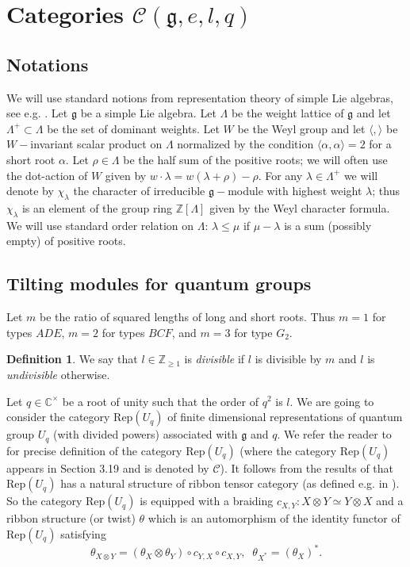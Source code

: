 \documentclass{amsart}
\theoremstyle{definition}
\newtheorem{definition}[theorem]{Definition}
\newcommand{\C}{\mathcal{C}}
\newcommand{\BC}{\mathbb{C}}
\newcommand{\Z}{\mathbb{Z}}
\newcommand{\g}{\mathfrak{g}}
\newcommand{\Rep}{\text{Rep}}
\numberwithin{equation}{section}
\begin{document}
\section{Categories $\C(\g,e,l,q)$}
\subsection{Notations} We will use standard notions from representation theory of simple Lie algebras,
see e.g. \cite{Scho}.
Let $\g$ be a simple Lie algebra. Let $\Lambda$ be the weight lattice of $\g$ and
let $\Lambda^+\subset \Lambda$ be the set of  dominant weights. Let $W$ be the Weyl group
and let $\langle , \rangle$ be $W-$invariant scalar product on $\Lambda$ normalized 
by the condition $\langle \alpha, \alpha \rangle =2$ for a short root $\alpha$. Let $\rho \in \Lambda$ be
the half sum of the positive roots; we will often use the dot-action of $W$ given by 
$w\cdot \lambda =w(\lambda +\rho)-\rho$. For any $\lambda \in \Lambda^+$ we will denote
by $\chi_\lambda$ the character of irreducible $\g-$module with highest weight $\lambda$; thus 
$\chi_\lambda$ is an element of the group ring $\Z[\Lambda]$ given by the Weyl character formula.
We will use standard order relation on $\Lambda$: $\lambda \le \mu$ if $\mu -\lambda$ is a sum 
(possibly empty) of positive roots.

\subsection{Tilting modules for quantum groups}\label{qgtitling}
Let $m$ be the ratio of squared lengths of long and short roots. Thus $m=1$ for types $ADE$, $m=2$
for types $BCF$, and $m=3$ for type $G_2$. 
\begin{definition} \label{divisible}
We say that $l\in \Z_{\ge 1}$ is \textit{divisible} if $l$ is divisible
by $m$ and $l$ is \textit{undivisible} otherwise.     \end{definition}

Let $q\in \BC^\times$ be a root of unity such that the order of $q^2$ is $l$. We are going to consider
the category $\Rep(U_q)$ of finite dimensional representations of quantum group $U_q$ (with divided powers) associated with $\g$ 
and $q$. We refer the reader to \cite[Section 3]{AP} for precise definition of the category $\Rep(U_q)$ (where
the category $\Rep(U_q)$ appears in Section 3.19 and is denoted by $\mathscr C$). It follows from
the results of \cite[Chapter 32]{Lb} that $\Rep(U_q)$ has a natural structure of ribbon tensor category 
(as defined e.g. in \cite[8.10]{EGNO}). So the category $\Rep(U_q)$ is equipped with a braiding
$c_{X,Y}: X\otimes Y\simeq Y\otimes X$ and a ribbon structure (or twist) $\theta$ which is an automorphism
of the identity functor of $\Rep(U_q)$ satisfying 
\begin{equation}\label{twist}
    \theta_{X\otimes Y}=(\theta_X\otimes \theta_Y)\circ c_{Y,X}\circ c_{X,Y}, \; \; \theta_{X^*}=(\theta_X)^*.
\end{equation}
\end{document}
